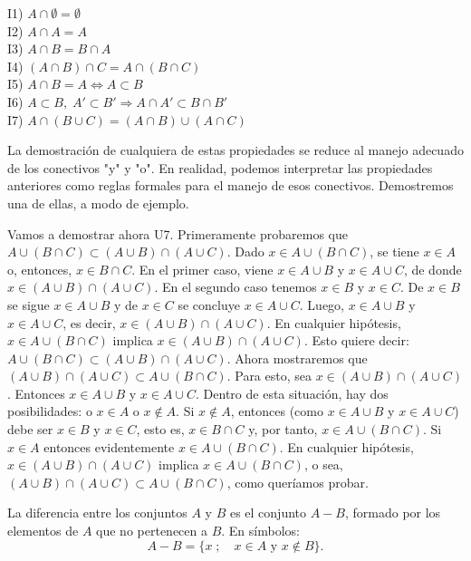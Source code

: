 \documentclass[12pt,oneside]{book}
\begin{document}
I1) \(A \cap \emptyset = \emptyset\)  \\
I2) \(A \cap A = A\)  \\
I3) \(A \cap B = B \cap A\)  \\
I4) \((A \cap B) \cap C = A \cap (B \cap C)\)  \\
I5) \(A \cap B = A \iff A \subset B\)  \\
I6) \(A \subset B,\; A' \subset B' \Rightarrow A \cap A' \subset B \cap B'\)  \\
I7) \(A \cap (B \cup C) = (A \cap B) \cup (A \cap C)\)

La demostración de cualquiera de estas propiedades se reduce al manejo adecuado de los conectivos "y" y "o". En realidad, podemos interpretar las propiedades anteriores como reglas formales para el manejo de esos conectivos. Demostremos una de ellas, a modo de ejemplo.

Vamos a demostrar ahora U7. Primeramente probaremos que \(A \cup (B \cap C) \subset (A \cup B) \cap (A \cup C)\). Dado \(x \in A \cup (B \cap C)\), se tiene \(x \in A\) o, entonces, \(x \in B \cap C\). En el primer caso, viene \(x \in A \cup B\) y \(x \in A \cup C\), de donde \(x \in (A \cup B) \cap (A \cup C)\). En el segundo caso tenemos \(x \in B\) y \(x \in C\). De \(x \in B\) se sigue \(x \in A \cup B\) y de \(x \in C\) se concluye \(x \in A \cup C\). Luego, \(x \in A \cup B\) y \(x \in A \cup C\), es decir, \(x \in (A \cup B) \cap (A \cup C)\). En cualquier hipótesis, \(x \in A \cup (B \cap C)\) implica \(x \in (A \cup B) \cap (A \cup C)\). Esto quiere decir: \(A \cup (B \cap C) \subset (A \cup B) \cap (A \cup C)\). Ahora mostraremos que \((A \cup B) \cap (A \cup C) \subset A \cup (B \cap C)\). Para esto, sea \(x \in (A \cup B) \cap (A \cup C)\). Entonces \(x \in A \cup B\) y \(x \in A \cup C\). Dentro de esta situación, hay dos posibilidades: o \(x \in A\) o \(x \notin A\). Si \(x \notin A\), entonces (como \(x \in A \cup B\) y \(x \in A \cup C\)) debe ser \(x \in B\) y \(x \in C\), esto es, \(x \in B \cap C\) y, por tanto, \(x \in A \cup (B \cap C)\). Si \(x \in A\) entonces evidentemente \(x \in A \cup (B \cap C)\). En cualquier hipótesis, \(x \in (A \cup B) \cap (A \cup C)\) implica \(x \in A \cup (B \cap C)\), o sea, \((A \cup B) \cap (A \cup C) \subset A \cup (B \cap C)\), como queríamos probar.

La diferencia entre los conjuntos \(A\) y \(B\) es el conjunto \(A - B\), formado por los elementos de \(A\) que no pertenecen a \(B\). En símbolos:
\[
A - B = \{x \; ; \quad x \in A \text{ y } x \notin B\}.
\]
\end{document}
